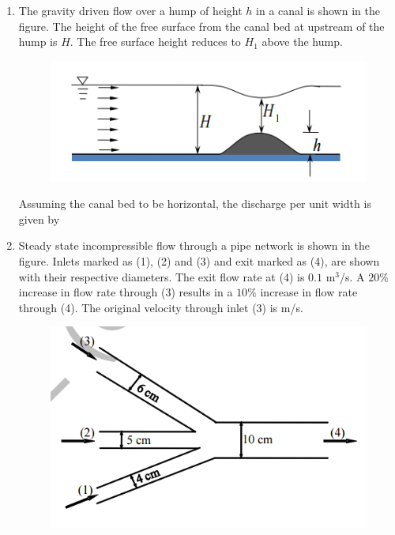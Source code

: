 \documentclass[a4paper,10pt]{article}
\begin{document}
\begin{enumerate}
    \item The gravity driven flow over a hump of height $h$ in a canal is shown in the figure. The height of the free surface from the canal bed at upstream of the hump is $H$. The free surface height reduces to $H_1$ above the hump.
    \begin{figure}[H] \centering \includegraphics[width=0.6\columnwidth]{Bq13.png} \caption*{} \label{fig:q13_fluid} \end{figure}
    Assuming the canal bed to be horizontal, the discharge per unit width is given by
    
    \hfill{}
    \begin{enumerate}[label=\Alph*)]
    \end{enumerate}

    \item Steady state incompressible flow through a pipe network is shown in the figure. Inlets marked as (1), (2) and (3) and exit marked as (4), are shown with their respective diameters. The exit flow rate at (4) is $0.1$ m$^3$/s. A $20\%$ increase in flow rate through (3) results in a $10\%$ increase in flow rate through (4). The original velocity through inlet (3) is \underline{\hspace{2cm}} m/s.
    \begin{figure}[H] \centering \includegraphics[width=0.6\columnwidth]{Bq14.png} \caption*{} \label{fig:q14_fluid} \end{figure}
    

\end{enumerate}
\end{document}

